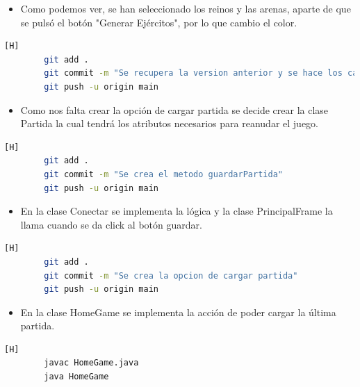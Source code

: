 \documentclass{article}
\begin{document}
	\begin{itemize}	
		\item Como podemos ver, se han seleccionado los reinos y las arenas, aparte de que se pulsó el botón "Generar Ejércitos", por lo que cambio el color.
	\end{itemize}
	
	
	
	
	\begin{lstlisting}[language=bash,caption={Commit: 89ff6b1edf4542deb3ff42f005f490882c63ed89 }][H]
		git add .
		git commit -m "Se recupera la version anterior y se hace los cambios en las clases para poder implementar guardar, ahora falta hacer la consulta a la base de datos"			
		git push -u origin main
	\end{lstlisting}
	
	\begin{itemize}	
		\item Como nos falta crear la opción de cargar partida se decide crear la clase Partida la cual tendrá los atributos necesarios para reanudar el juego.
	\end{itemize}
	
	
	
	
		\begin{lstlisting}[language=bash,caption={Commit: e24b6eb460d4e868fad82818e2b735efea714c23 }][H]
		git add .
		git commit -m "Se crea el metodo guardarPartida"			
		git push -u origin main
	\end{lstlisting}
	
	\begin{itemize}	
		\item En la clase Conectar se implementa la lógica y la clase PrincipalFrame la llama cuando se da click al botón guardar.
	\end{itemize}
	
	
			\begin{lstlisting}[language=bash,caption={Commit: c15b7d87562a4a723111d504c4ae5b4a27526f91 }][H]
		git add .
		git commit -m "Se crea la opcion de cargar partida"			
		git push -u origin main
	\end{lstlisting}
	
	\begin{itemize}	
		\item En la clase HomeGame se implementa la acción de poder cargar la última partida.
	\end{itemize}
	
	
	
	\begin{lstlisting}[language=bash,caption={Interfaz del juego}][H]
		javac HomeGame.java
		java HomeGame
	\end{lstlisting}
\end{document}
